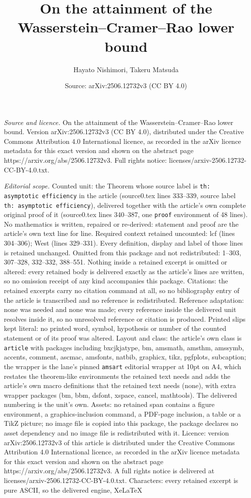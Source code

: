 \documentclass[10pt,a4paper]{amsart}
\title[On the attainment of the Wasserstein--Cramer--Rao lower boun]{On the attainment of the Wasserstein--Cramer--Rao lower bound}
\author{Hayato Nishimori, Takeru Matsuda}
\date{Source: arXiv:2506.12732v3 (CC BY 4.0)}
\begin{document}
\maketitle

\noindent\emph{Source and licence.} On the attainment of the Wasserstein--Cramer--Rao lower bound. Version arXiv:2506.12732v3 (CC BY 4.0), distributed under the Creative Commons Attribution 4.0 International licence, as recorded in the arXiv licence metadata for this exact version and shown on the abstract page https://arxiv.org/abs/2506.12732v3. Full rights notice: licenses/arxiv-2506.12732-CC-BY-4.0.txt.\par\smallskip

\noindent\textit{Editorial scope.} Counted unit: the Theorem whose source label is \texttt{th: asymptotic efficiency} in the article (source0.tex lines 333--339, source label \texttt{th: asymptotic efficiency}), delivered together with the article's own complete original proof of it (source0.tex lines 340--387, one \texttt{proof} environment of 48 lines). No mathematics is written, repaired or re-derived: statement and proof are the article's own text line for line. Required context retained uncounted: lcf (lines 304--306); West (lines 329--331). Every definition, display and label of those lines is retained unchanged. Omitted from this package and not redistributed: 1--303, 307--328, 332--332, 388--551. Nothing inside a retained excerpt is omitted or altered: every retained body is delivered exactly as the article's lines are written, so no omission receipt of any kind accompanies this package. Citations: the retained excerpts carry no citation command at all, so no bibliography entry of the article is transcribed and no reference is redistributed. Reference adaptation: none was needed and none was made; every reference inside the delivered unit resolves inside it, so no unresolved reference or citation is produced. Printed slips kept literal: no printed word, symbol, hypothesis or number of the counted statement or of its proof was altered. Layout and class: the article's own class is \texttt{article} with packages including bxcjkjatype, bm, amsmath, amsthm, amssymb, accents, comment, ascmac, amsfonts, natbib, graphicx, tikz, pgfplots, subcaption; the wrapper is the lane's pinned \texttt{amsart} editorial wrapper at 10pt on A4, which restates the theorem-like environments the retained text needs and adds the article's own macro definitions that the retained text needs (none), with extra wrapper packages (bm, bbm, dsfont, xspace, cancel, mathtools). The delivered numbering is the unit's own. Assets: no retained span contains a figure environment, a graphics-inclusion command, a PDF-page inclusion, a table or a TikZ picture; no image file is copied into this package, the package declares no asset dependency and no image file is redistributed with it. Licence: version arXiv:2506.12732v3 of this article is distributed under the Creative Commons Attribution 4.0 International licence, as recorded in the arXiv licence metadata for this exact version and shown on the abstract page https://arxiv.org/abs/2506.12732v3. A full rights notice is delivered at licenses/arxiv-2506.12732-CC-BY-4.0.txt. Characters: every retained excerpt is pure ASCII, so the delivered engine, XeLaTeX 
\end{document}
